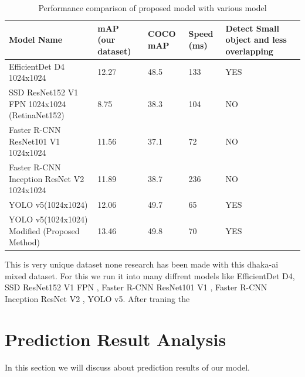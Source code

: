 \begin{table}[!h]
  \centering
  \caption[Performance comparison of proposed model with various model]{Performance comparison of proposed model with various model}
  \label{tab:model_comp}
  {\renewcommand{\arraystretch}{1.7}
      \begin{tabular}{p{4cm} p{1cm} p{0.8cm} p{1cm} p{2.6cm}}
          \toprule
          Model Name                                    & mAP (our dataset) & COCO mAP & Speed (ms) & Detect Small object and less overlapping \\
          \hline
          EfficientDet D4 1024x1024                     & 12.27             & 48.5     & 133        & YES                                      \\
          SSD ResNet152 V1 FPN 1024x1024 (RetinaNet152) & 8.75              & 38.3     & 104        & NO                                       \\
          Faster R-CNN ResNet101 V1 1024x1024           & 11.56             & 37.1     & 72         & NO                                       \\
          Faster R-CNN Inception ResNet V2 1024x1024    & 11.89             & 38.7     & 236        & NO                                       \\
          YOLO v5(1024x1024)                            & 12.06             & 49.7     & 65         & YES                                      \\
          YOLO v5(1024x1024) Modified (Proposed Method) & 13.46             & 49.8     & 70         & YES                                      \\
          \bottomrule
    \end{tabular}
  }
\end{table}

This is very unique dataset none research has been made with this dhaka-ai mixed dataset. For this we run it into many diffrent models like EfficientDet D4, SSD ResNet152 V1 FPN , Faster R-CNN ResNet101 V1 , Faster R-CNN Inception ResNet V2 , YOLO v5. After traning the 


\newpage
\section{Prediction Result Analysis}
In this section we will discuss about prediction results of our model.

